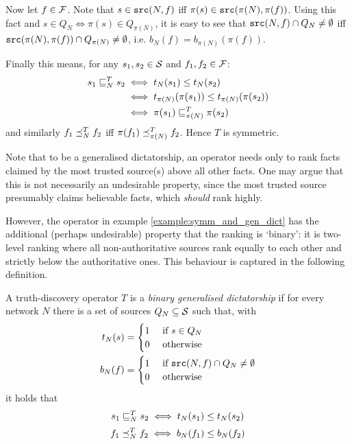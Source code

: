 \documentclass[../main.tex]{subfiles}
\begin{document}
\begin{example}
Now let $f \in \F$. Note that $s \in \src(N, f)$ iff $\pi(s) \in \src(\pi(N),
\pi(f))$. Using this fact and $s \in Q_N \iff \pi(s) \in Q_{\pi(N)}$, it is
easy to see that $\src(N, f) \cap Q_N \ne \emptyset$ iff $\src(\pi(N), \pi(f))
\cap Q_{\pi(N)} \ne \emptyset$, i.e. $b_N(f) = b_{\pi(N)}(\pi(f))$.

Finally this means, for any $s_1, s_2 \in \S$ and $f_1, f_2 \in \F$:
\begin{align*}
    s_1 \sle_N^T s_2 & \iff t_N(s_1) \le t_N(s_2) \\
                     & \iff t_{\pi(N)}(\pi(s_1)) \le t_{\pi(N)}(\pi(s_2)) \\
                     & \iff \pi(s_1) \sle_{\pi(N)}^T \pi(s_2)
\end{align*}
and similarly $f_1 \fle_N^T f_2$ iff $\pi(f_1) \fle_{\pi(N)}^T f_2$. Hence $T$
is symmetric.
\end{example}

Note that to be a generalised dictatorship, an operator needs only to rank
facts claimed by the most trusted source(s) above all other facts. One may
argue that this is not necessarily an undesirable property, since the most
trusted source presumably claims believable facts, which \emph{should} rank
highly.

However, the operator in example \ref{example:symm_and_gen_dict} has the
additional (perhaps undesirable) property that the ranking is `binary': it is
two-level ranking where all non-authoritative sources rank equally to each
other and strictly below the authoritative ones. This behaviour is captured in
the following definition.

\begin{definition}
A truth-discovery operator $T$ is a \emph{binary generalised dictatorship} if
for every network $N$ there is a set of sources $Q_N \subseteq \S$ such that,
with
\begin{align*}
    t_N(s) & = \begin{cases}
        1 & \text{ if } s \in Q_N \\
        0 & \text{ otherwise}
    \end{cases} \\
    b_N(f) & = \begin{cases}
        1 & \text{ if } \src(N, f) \cap Q_N \ne \emptyset \\
        0 & \text{ otherwise}
    \end{cases}
\end{align*}
it holds that
\[ s_1 \sle_N^T s_2 \iff t_N(s_1) \le t_N(s_2) \]
\[ f_1 \fle_N^T f_2 \iff b_N(f_1) \le b_N(f_2) \]

\end{definition}
\end{document}
